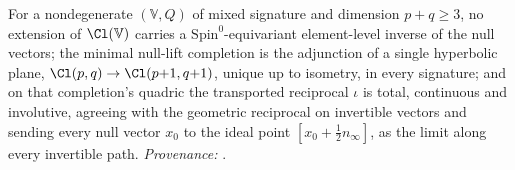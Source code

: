 For a nondegenerate $(\mathbb{V}, Q)$ of mixed signature and dimension $p + q \geq 3$, no extension of $\Cl(\mathbb{V})$ carries a $\mathrm{Spin}^{0}$-equivariant element-level inverse of the null vectors; the minimal null-lift completion is the adjunction of a single hyperbolic plane, $\Cl(p,q) \to \Cl(p{+}1,q{+}1)$, unique up to isometry, in every signature; and on that completion's quadric the transported reciprocal $\iota$ is total, continuous and involutive, agreeing with the geometric reciprocal on invertible vectors and sending every null vector $x_{0}$ to the ideal point $[x_{0} + \tfrac12 n_{\infty}]$, as the limit along every invertible path. \emph{Provenance:} \cite[Thms.~4.2, 4.10, 4.13]{ButlerT1}.
